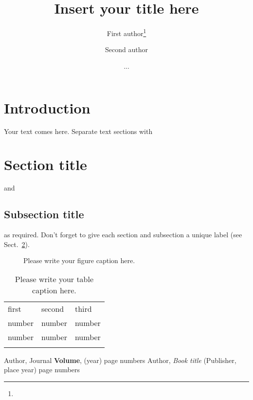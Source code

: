\documentclass[epjCONF]{svjour}
\begin{document}
%
\title{Insert your title here}
\author{First author\fnmsep\thanks{} \and Second author \and ... }
%
%
%
\maketitle
%
\section{Introduction}
\label{intro}
Your text comes here. Separate text sections with
\section{Section title}
\label{sec:1}
and \cite{RefJ}
\subsection{Subsection title}
\label{sec:2}
as required. Don't forget to give each section
and subsection a unique label (see Sect.~\ref{sec:1}).
%

\begin{figure}
\caption{Please write your figure caption here.}
\label{fig:1}       %
\end{figure}
%
\begin{table}
\caption{Please write your table caption here.}
\label{tab:1}       %
\begin{tabular}{lll}
\hline\noalign{\smallskip}
first & second & third  \\
\noalign{\smallskip}\hline\noalign{\smallskip}
number & number & number \\
number & number & number \\
\noalign{\smallskip}\hline
\end{tabular}
\end{table}
%
\begin{thebibliography}{}
Author, Journal \textbf{Volume}, (year) page numbers
Author, \textit{Book title} (Publisher, place year) page numbers
\end{thebibliography}
\end{document}
